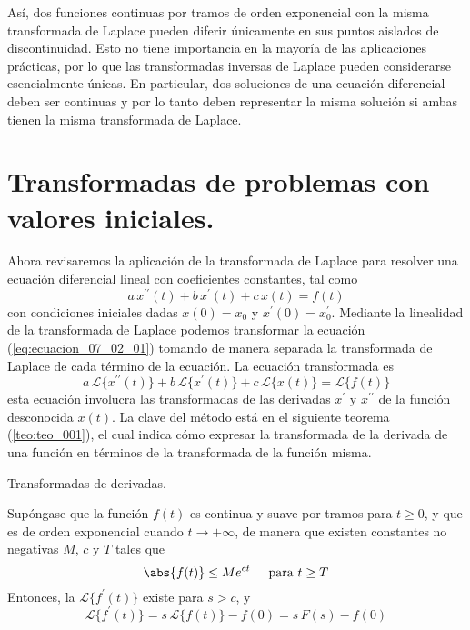 Así, dos funciones continuas por tramos de orden exponencial con la misma transformada de Laplace pueden diferir únicamente en sus puntos aislados de discontinuidad. Esto no tiene importancia en la mayoría de las aplicaciones prácticas, por lo que las transformadas inversas de Laplace pueden considerarse esencialmente únicas. En particular, dos soluciones de una ecuación diferencial deben ser continuas y por lo tanto deben representar la misma solución si ambas tienen la misma transformada de Laplace.
\section{Transformadas de problemas con valores iniciales.}
Ahora revisaremos la aplicación de la transformada de Laplace para resolver una ecuación diferencial lineal con coeficientes constantes, tal como 
\begin{equation}
a \, x^{\prime \prime} (t) + b \, x^{\prime} (t) + c \, x(t) = f(t)
\label{eq:ecuacion_07_02_01}
\end{equation}
con condiciones iniciales dadas $x(0) = x_{0}$ y $x^{\prime}(0) = x^{\prime}_{0}$. Mediante la linealidad de la
transformada de Laplace podemos transformar la ecuación (\ref{eq:ecuacion_07_02_01}) tomando de manera separada la transformada de Laplace de cada término de la ecuación. La ecuación transformada es
\begin{equation}
a \, \mathscr{L} \{ x^{\prime \prime} (t) \} + b \, \mathscr{L} \{ x^{\prime} (t) \} + c \, \mathscr{L} \{ x (t) \} = \mathscr{L} \{ f(t) \}
\label{eq:ecuacion_07_02_02}
\end{equation}
esta ecuación involucra las transformadas de las derivadas $x^{\prime}$ y $x^{\prime \prime}$ de la función desconocida 
$x(t)$. La clave del método está en el siguiente teorema (\ref{teo:teo_001}), el cual indica cómo expresar la transformada de la derivada de una función en términos de la transformada de la función misma.
\begin{teo}{Transformadas de derivadas.}\label{teo:teo_001}

Supóngase que la función $f(t)$ es continua y suave por tramos para $t \geq 0$, y que es de orden exponencial cuando $t \to + \infty$, de manera que existen constantes no negativas $M$, $c$ y $T$ tales que
\begin{equation}
\abs{f(t)} \leq M e^{ct} \hspace{0.5cm} \mbox{para } t \geq T
\label{eq:ecuacion_07_02_03}
\end{equation}
Entonces, la $\mathscr{L} \{ f^{\prime} (t) \} $ existe para $s > c$, y
\begin{equation}
\mathscr{L} \{ f^{\prime} (t) \} = s \, \mathscr{L} \{ f(t) \} - f(0) = s \, F(s) - f(0)
\label{eq:ecuacion_07_02_04}
\end{equation}
\end{teo}
